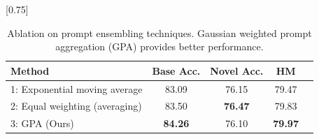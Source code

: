 \begin{table}[t!]
   \small \centering
  \setlength{\tabcolsep}{10pt}
    \scalebox{0.75}[0.75]{
    \begin{tabular}{l cccc}
    \toprule
    Method  & Base Acc. & Novel Acc. & HM\\
            \midrule
    1: Exponential moving average & 83.09	&76.15 &	79.47 \\
    2: Equal weighting (averaging) & 83.50	&\textbf{76.47}	&79.83 \\
    \rowcolor{tabhighlight} 3:  GPA (Ours) & \textbf{84.26} & {76.10} & \textbf{79.97} \\
    \bottomrule
    \end{tabular}
    }\vspace{-0.5em}
    \caption{Ablation on prompt ensembling techniques. Gaussian weighted prompt aggregation (GPA) provides better performance. 
    }
    \label{tab:ablations_on_ensembling}
\end{table}